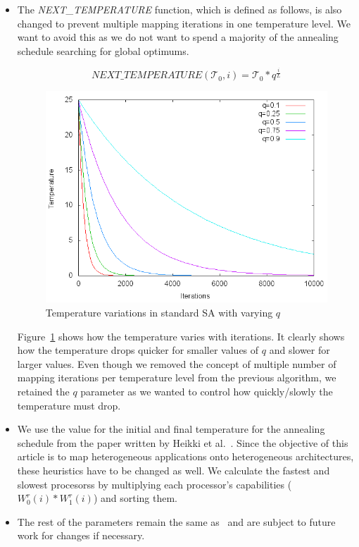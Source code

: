 \begin{itemize}
\item The \textit{NEXT\_TEMPERATURE} function, which is defined as follows, is
also changed to prevent multiple mapping iterations in one temperature level. We
want to avoid this as we do not want to spend a majority of the annealing
schedule searching for global optimums. 

\begin{equation}
  \textit{NEXT\_TEMPERATURE}(\mathcal{T}_0, i) =
  \mathcal{T}_0*q^{\frac{i}{L}}
\end{equation}

\begin{figure}[h!]
  \centering
  \includegraphics[scale=0.35]{./figures/temperature-drop}
  \caption{Temperature variations in standard SA with varying $q$}
  \label{fig:7}
\end{figure}
Figure~\ref{fig:7} shows how the temperature varies with iterations. It
clearly shows how the temperature drops quicker for smaller values of
$q$ and slower for larger values. Even though we removed the concept of
multiple number of mapping iterations per temperature level from the
previous algorithm, we retained the $q$ parameter as we wanted to
control how quickly/slowly the temperature must drop.

\item We use the value for the initial and final temperature for the annealing
schedule from the paper written by Heikki et al.~\cite{hors06}. Since the
objective of this article is to map heterogeneous applications onto
heterogeneous architectures, these heuristics have to be changed as well. We 
calculate the fastest and slowest procesorss by multiplying each processor's
capabilities ($W^r_0(i) * W^r_1(i)$) and sorting them. 

\item The rest of the parameters remain the same as~\cite{hors06} and are subject to future work
for changes if necessary.

\end{itemize} 

